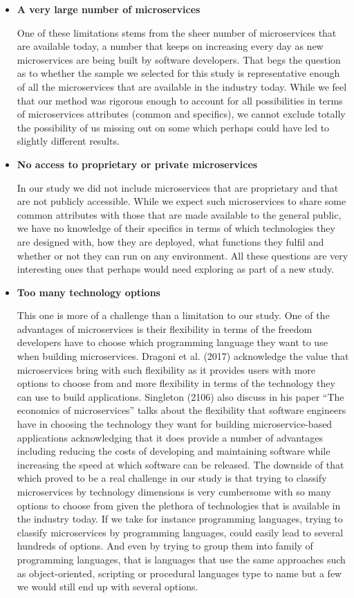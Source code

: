 \documentclass{article}
\begin{document}
\begin{itemize}


\item \textbf{A very large number of microservices}

One of these limitations stems from the sheer number of microservices that are available today, a number that keeps on increasing every day as new microservices are being built by software developers. That begs the question as to whether the sample we selected for this study is representative enough of all the microservices that are available in the industry today. While we feel that our method was rigorous enough to account for all possibilities in terms of microservices attributes (common and specifics), we cannot exclude totally the possibility of us missing out on some which perhaps could have led to slightly different results. 

\item \textbf{No access to proprietary or private microservices}

In our study we did not include microservices that are proprietary and that are not publicly accessible. While we expect such microservices to share some common attributes with those that are made available to the general public, we have no knowledge of their specifics in terms of which technologies they are designed with, how they are deployed, what functions they fulfil and whether or not they can run on any environment. All these questions are very interesting ones that perhaps would need exploring as part of a new study.

\item \textbf{Too many technology options}

This one is more of a challenge than a limitation to our study. One of the advantages of microservices is their flexibility in terms of the freedom developers have to choose which programming language they want to use when building microservices. Dragoni et al. (2017) acknowledge the value that microservices bring with such flexibility as it provides users with more options to choose from and more flexibility in terms of the technology they can use to build applications. Singleton (2106) also discuss in his paper “The economics of microservices” talks about the flexibility that software engineers have in choosing the technology they want for building microservice-based applications acknowledging that it does provide a number of advantages including reducing the costs of developing and maintaining software while increasing the speed at which software can be released. The downside of that which proved to be a real challenge in our study is that trying to classify microservices by technology dimensions is very cumbersome with so many options to choose from given the plethora of technologies that is available in the industry today. If we take for instance programming languages, trying to classify microservices by programming languages, could easily lead to several hundreds of options. And even by trying to group them into family of programming languages, that is languages that use the same approaches such as object-oriented, scripting or procedural languages type to name but a few we would still end up with several options. 


\end{itemize}
\end{document}

